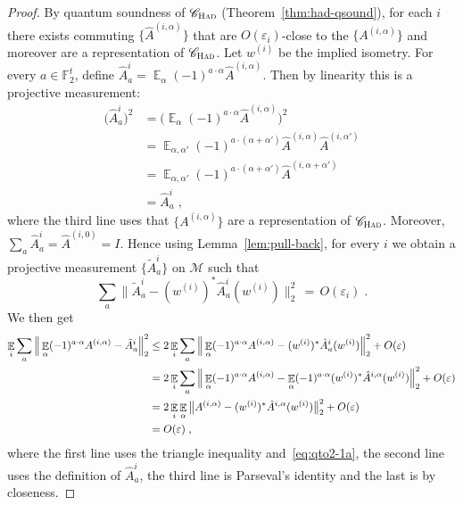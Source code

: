\documentclass[11pt]{article}
\theoremstyle{definition}
\newcommand{\code}{\mathscr{C}}
\newcommand{\Id}{\ensuremath{I}}
\DeclareMathOperator*{\Expectation}{\mathbb{E}}
\newcommand{\Es}[1]{\Expectation_{#1}}
\newcommand{\F}{\ensuremath{\mathbb{F}}}
\newcommand{\cM}{\ensuremath{\mathcal{M}}}
\newcommand{\Had}{\ensuremath{\textsc{Had}}}
\newcommand{\eps}{\varepsilon}
\begin{document}
\begin{proof}
By quantum soundness of $\code_\Had$ (Theorem~\ref{thm:had-qsound}), for each $i$ there exists commuting $\{\hat{A}^{(i,\alpha)}\}$ that are $O(\eps_i)$-close to the $\{A^{(i,\alpha)}\}$ and moreover are a representation of $\code_{\Had}$. Let $w^{(i)}$ be the implied isometry. For every $a\in \F_2^t$, define $\hat{A}^{i}_{a}=\Es{\alpha}(-1)^{a\cdot \alpha} \hat{A}^{(i,\alpha)}$. Then by linearity this is a projective measurement:
\begin{align*}
\big(\hat{A}^{i}_{a}\big)^2 &=\Big(\Es{\alpha}(-1)^{a\cdot \alpha} \hat{A}^{(i,\alpha)}\Big)^2\\
&= \Es{\alpha,\alpha' }(-1)^{a\cdot (\alpha+\alpha')} \hat{A}^{(i,\alpha)}\hat{A}^{(i,\alpha')}\\
&=\Es{\alpha,\alpha' }(-1)^{a\cdot (\alpha+\alpha')} \hat{A}^{(i,\alpha+\alpha')}\\
&=\hat{A}^{i}_{a}\;,
\end{align*}
where the third line uses that  $\{A^{(i,\alpha)}\}$ are a representation of $\code_{\Had}$. Moreover, $\sum_a \hat{A}^{i}_{a} = \hat{A}^{(i,0)}=\Id$. Hence using Lemma~\ref{lem:pull-back}, for every $i$ we obtain a projective measurement $\{\tilde{A}^{i}_{a}\}$ on $\cM$ such that
\begin{equation}\label{eq:qto2-1a}
 \sum_a \big\| \tilde{A}^i_a - (w^{(i)})^* \hat{A}^i_a (w^{(i)}) \big\|_2^2 \,=\, O(\eps_i)\;.
\end{equation}
We then get
\begin{align}
 \Es{i} \sum_a \Big\| \Es{\alpha} (-1)^{a\cdot \alpha} A^{(i,\alpha)} -  \tilde{A}^i_a \Big\|_2^2 
&\leq  2\Es{i} \sum_a \Big\| \Es{\alpha} (-1)^{a\cdot \alpha} A^{(i,\alpha)} -  (w^{(i)})^* \hat{A}^i_a (w^{(i)}) \Big\|_2^2 + O(\eps)\notag\\
&=  2\Es{i} \sum_a \Big\| \Es{\alpha} (-1)^{a\cdot \alpha} A^{(i,\alpha)} -   \Es{\alpha} (-1)^{a\cdot \alpha} (w^{(i)})^* \hat{A}^{i,\alpha} (w^{(i)}) \Big\|_2^2+ O(\eps) \notag\\
&= 2\Es{i} \Es{\alpha} \big\| A^{(i,\alpha)} -    (w^{(i)})^* \hat{A}^{i,\alpha} (w^{(i)}) \big\|_2^2+ O(\eps)\notag\\
&= O(\eps)\;, \label{eq:qto2-2}
\end{align}
where the first line uses the triangle inequality and~\eqref{eq:qto2-1a}, the second line uses the definition of $\hat{A}^i_a$, the third line is Parseval's identity and the last is by closeness. 


\end{proof}
\end{document}
